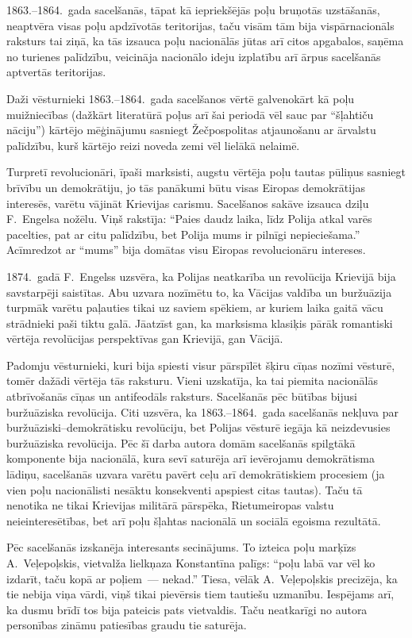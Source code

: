\documentclass[twoside,a5paper,12pt,fleqn,openany]{extbook}
\begin{document}
1863.--1864.~gada sacelšanās, tāpat kā iepriekšējās poļu bruņotās uzstāšanās, neaptvēra visas poļu apdzīvotās teritorijas, taču visām tām bija vispārnacionāls raksturs tai ziņā, ka tās izsauca poļu nacionālās jūtas arī citos apgabalos, saņēma no turienes palīdzību, veicināja nacionālo ideju izplatību arī ārpus sacelšanās aptvertās teritorijas.

Daži vēsturnieki 1863.--1864.~gada sacelšanos vērtē galvenokārt kā poļu muižniecības (dažkārt literatūrā poļus arī šai periodā vēl sauc par ``šļahtiču nāciju'') kārtējo mēģinājumu sasniegt Žečpospolitas atjaunošanu ar ārvalstu palīdzību, kurš kārtējo reizi noveda zemi vēl lielākā nelaimē.

Turpretī revolucionāri, īpaši marksisti, augstu vērtēja poļu tautas pūliņus sasniegt brīvību un demokrātiju, jo tās panākumi būtu visas Eiropas demokrātijas interesēs, varētu vājināt Krievijas carismu. Sacelšanos sakāve izsauca dziļu F.~Engelsa nožēlu. Viņš rakstīja: ``Paies daudz laika, līdz Polija atkal varēs pacelties, pat ar citu palīdzību, bet Polija mums ir pilnīgi nepieciešama.'' Acīmredzot ar ``mums'' bija domātas visu Eiropas revolucionāru intereses.

1874.~gadā F.~Engelss uzsvēra, ka Polijas neatkarība un revolūcija Krievijā bija savstarpēji saistītas. Abu uzvara nozīmētu to, ka Vācijas valdība un buržuāzija turpmāk varētu paļauties tikai uz saviem spēkiem, ar kuriem laika gaitā vācu strādnieki paši tiktu galā. Jāatzīst gan, ka marksisma klasiķis pārāk romantiski vērtēja revolūcijas perspektīvas gan Krievijā, gan Vācijā.

Padomju vēsturnieki, kuri bija spiesti visur pārspīlēt šķiru cīņas nozīmi vēsturē, tomēr dažādi vērtēja tās raksturu. Vieni uzskatīja, ka tai piemita nacionālās atbrīvošanās cīņas un antifeodāls raksturs. Sacelšanās pēc būtības bijusi buržuāziska revolūcija. Citi uzsvēra, ka 1863.--1864.~gada sacelšanās nekļuva par buržuāziski--demokrātisku revolūciju, bet Polijas vēsturē iegāja kā neizdevusies buržuāziska revolūcija. Pēc šī darba autora domām sacelšanās spilgtākā komponente bija nacionālā, kura sevī saturēja arī ievērojamu demokrātisma lādiņu, sacelšanās uzvara varētu pavērt ceļu arī demokrātiskiem procesiem (ja vien poļu nacionālisti nesāktu konsekventi apspiest citas tautas). Taču tā nenotika ne tikai Krievijas militārā pārspēka, Rietumeiropas valstu neieinteresētības, bet arī poļu šļahtas nacionālā un sociālā egoisma rezultātā.

Pēc sacelšanās izskanēja interesants secinājums. To izteica poļu marķīzs A.~Veļepoļskis, vietvalža lielkņaza Konstantīna palīgs: ``poļu labā var vēl ko izdarīt, taču kopā ar poļiem~--- nekad.'' Tiesa, vēlāk A.~Veļepoļskis precizēja, ka tie nebija viņa vārdi, viņš tikai pievērsis tiem tautiešu uzmanību. Iespējams arī, ka dusmu brīdī tos bija pateicis pats vietvaldis. Taču neatkarīgi no autora personības zināmu patiesības graudu tie saturēja.
\end{document}
